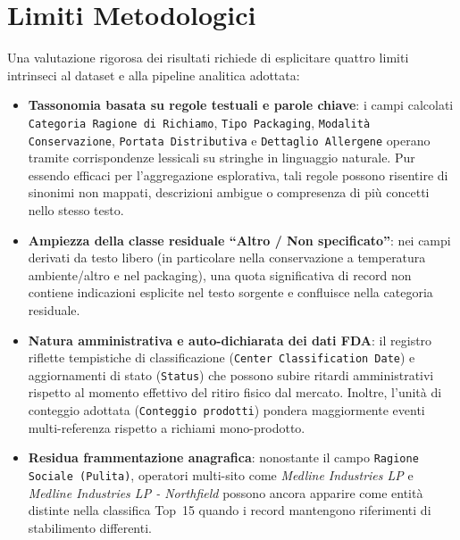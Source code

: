 \section{Limiti Metodologici}
Una valutazione rigorosa dei risultati richiede di esplicitare quattro limiti intrinseci al dataset e alla pipeline analitica adottata:
\begin{itemize}
    \item \textbf{Tassonomia basata su regole testuali e parole chiave}: i campi calcolati \texttt{Categoria Ragione di Richiamo}, \texttt{Tipo Packaging}, \texttt{Modalità Conservazione}, \texttt{Portata Distributiva} e \texttt{Dettaglio Allergene} operano tramite corrispondenze lessicali su stringhe in linguaggio naturale. Pur essendo efficaci per l'aggregazione esplorativa, tali regole possono risentire di sinonimi non mappati, descrizioni ambigue o compresenza di più concetti nello stesso testo.
    \item \textbf{Ampiezza della classe residuale ``Altro / Non specificato''}: nei campi derivati da testo libero (in particolare nella conservazione a temperatura ambiente/altro e nel packaging), una quota significativa di record non contiene indicazioni esplicite nel testo sorgente e confluisce nella categoria residuale. 
    \item \textbf{Natura amministrativa e auto-dichiarata dei dati FDA}: il registro riflette tempistiche di classificazione (\texttt{Center Classification Date}) e aggiornamenti di stato (\texttt{Status}) che possono subire ritardi amministrativi rispetto al momento effettivo del ritiro fisico dal mercato. Inoltre, l'unità di conteggio adottata (\texttt{Conteggio prodotti}) pondera maggiormente eventi multi-referenza rispetto a richiami mono-prodotto.
    \item \textbf{Residua frammentazione anagrafica}: nonostante il campo \texttt{Ragione Sociale (Pulita)}, operatori multi-sito come \textit{Medline Industries LP} e \textit{Medline Industries LP - Northfield} possono ancora apparire come entità distinte nella classifica Top~15 quando i record mantengono riferimenti di stabilimento differenti.
\end{itemize}
